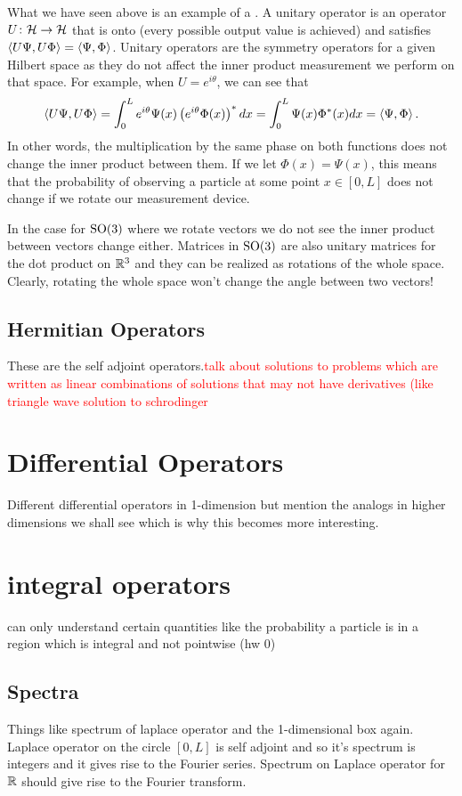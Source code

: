 What we have seen above is an example of a .  A unitary operator is an operator $U\colon \mathcal{H} \to \mathcal{H}$ that is onto (every possible output value is achieved) and satisfies $\left\langle U\Psi, U\Phi \right\rangle=\left\langle \Psi, \Phi \right\rangle$.  Unitary operators are the symmetry operators for a given Hilbert space as they do not affect the inner product measurement we perform on that space.  For example, when $U=e^{i\theta}$, we can see that
\[
\left\langle U\Psi, U\Phi \right\rangle = \int_0^L e^{i\theta}\Psi(x) \left(e^{i\theta} \Phi(x)\right)^*dx = \int_0^L \Psi(x)\Phi^*(x)dx = \left\langle \Psi, \Phi \right\rangle.
\]
In other words, the multiplication by the same phase on both functions does not change the inner product between them. If we let $\Phi(x)=\Psi(x)$, this means that the probability of observing a particle at some point $x\in [0,L]$ does not change if we rotate our measurement device.  

In the case for $\mathrm{SO}(3)$ where we rotate vectors we do not see the inner product between vectors change either.  Matrices in $\mathrm{SO}(3)$ are also unitary matrices for the dot product on $\mathbb{R}^3$ and they can be realized as rotations of the whole space.  Clearly, rotating the whole space won't change the angle between two vectors!



\subsection{Hermitian Operators}
These are the self adjoint operators.\textcolor{red}{talk about solutions to problems which are written as linear combinations of solutions that may not have derivatives (like triangle wave solution to schrodinger}

\section{Differential Operators}
Different differential operators in 1-dimension but mention the analogs in higher dimensions we shall see which is why this becomes more interesting. 

\section{integral operators}

can only understand certain quantities like the probability a particle is in a region which is integral and not pointwise (hw 0)

\subsection{Spectra}

Things like spectrum of laplace operator and the 1-dimensional box again. Laplace operator on the circle $[0,L]$ is self adjoint and so it's spectrum is integers and it gives rise to the Fourier series.  Spectrum on Laplace operator for $\mathbb{R}$ should give rise to the Fourier transform.  